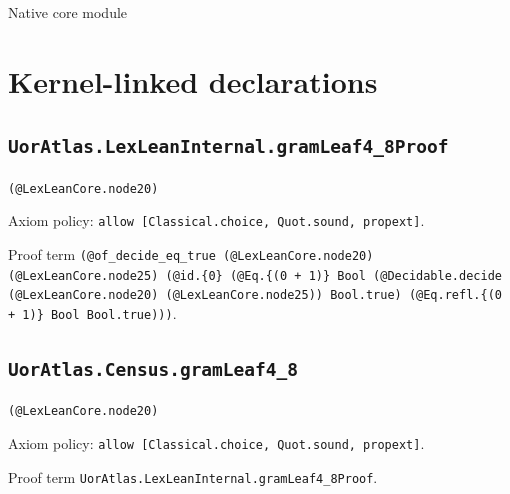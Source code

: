 \documentclass[11pt]{article}
\begin{document}
\begin{center}{\LARGE Native core module}\end{center}
\section*{Kernel-linked declarations}
\subsection*{\texttt{UorAtlas.LexLeanInternal.gramLeaf4\_8Proof}}
\noindent\texttt{(@LexLeanCore.node20)}\par
\noindent Axiom policy: \texttt{allow [Classical.choice, Quot.sound, propext]}.\par
\noindent Proof term \texttt{(@of\_decide\_eq\_true (@LexLeanCore.node20) (@LexLeanCore.node25) (@id.\{0\} (@Eq.\{(0 + 1)\} Bool (@Decidable.decide (@LexLeanCore.node20) (@LexLeanCore.node25)) Bool.true) (@Eq.refl.\{(0 + 1)\} Bool Bool.true)))}.\par
\subsection*{\texttt{UorAtlas.Census.gramLeaf4\_8}}
\noindent\texttt{(@LexLeanCore.node20)}\par
\noindent Axiom policy: \texttt{allow [Classical.choice, Quot.sound, propext]}.\par
\noindent Proof term \texttt{UorAtlas.LexLeanInternal.gramLeaf4\_8Proof}.\par
\end{document}
